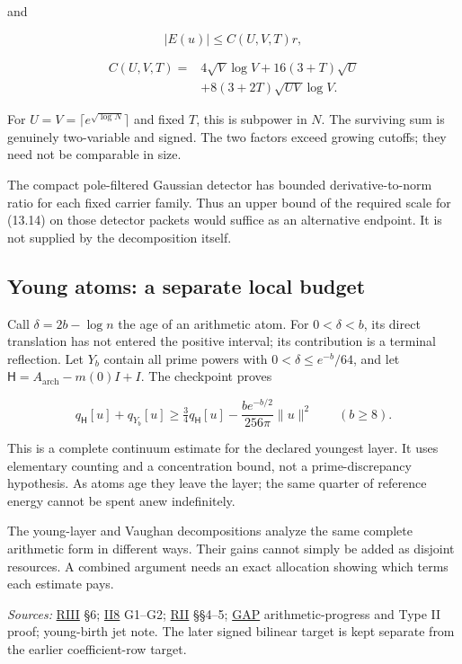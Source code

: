 \documentclass[
  10pt,
  a4paper,
  10pt,
  oneside,
  openany]{book}
\begin{document}
and

\[
|E(u)|\le C(U,V,T)r,
\tag{13.15}\label{eq:13.15}
\]

\[
\begin{aligned}
C(U,V,T)={}&4\sqrt V\log V
+16(3+T)\sqrt U\\
&+8(3+2T)\sqrt{UV}\log V.
\end{aligned}
\tag{13.16}\label{eq:13.16}
\]

For \(U=V=\lceil e^{\sqrt{\log N}}\rceil\) and fixed \(T\), this is
subpower in \(N\). The surviving sum is genuinely two-variable and
signed. The two factors exceed growing cutoffs; they need not be
comparable in size.

The compact pole-filtered Gaussian detector has bounded
derivative-to-norm ratio for each fixed carrier family. Thus an upper
bound of the required scale for (13.14) on those detector packets would
suffice as an alternative endpoint. It is not supplied by the
decomposition itself.

\subsection{Young atoms: a separate local
budget}\label{young-atoms-a-separate-local-budget}

Call \(\delta=2b-\log n\) the age of an arithmetic atom. For
\(0<\delta<b\), its direct translation has not entered the positive
interval; its contribution is a terminal reflection. Let \(Y_b\) contain
all prime powers with \(0<\delta\le e^{-b}/64\), and let
\(\mathsf H=A_{\mathrm{arch}}-m(0)I+I\). The checkpoint proves

\[
q_{\mathsf H}[u]+q_{Y_b}[u]
\ge\tfrac34q_{\mathsf H}[u]
-\frac{be^{-b/2}}{256\pi}\|u\|^2
\qquad(b\ge8).
\tag{13.17}\label{eq:13.17}
\]

This is a complete continuum estimate for the declared youngest layer.
It uses elementary counting and a concentration bound, not a
prime-discrepancy hypothesis. As atoms age they leave the layer; the
same quarter of reference energy cannot be spent anew indefinitely.

The young-layer and Vaughan decompositions analyze the same complete
arithmetic form in different ways. Their gains cannot simply be added as
disjoint resources. A combined argument needs an exact allocation
showing which terms each estimate pays.

\emph{Sources:} \hyperref[source-riii]{RIII} §6;
\hyperref[source-ii8]{II8} G1--G2; \hyperref[source-rii]{RII} §§4--5;
\hyperref[source-gap]{GAP} arithmetic-progress and Type II proof;
young-birth jet note. The later signed bilinear target is kept separate
from the earlier coefficient-row target.
\end{document}
